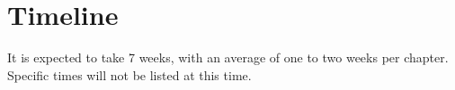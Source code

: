 \section{Timeline}
It is expected to take 7 weeks, with an average of one to two weeks per
chapter. Specific times will not be listed at this time.